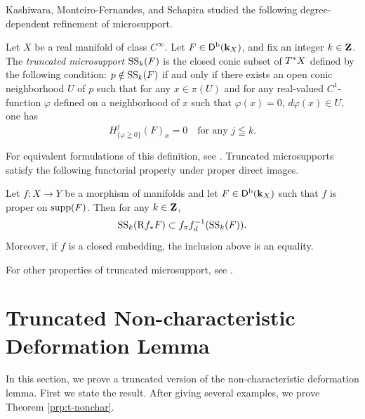 Kashiwara, Monteiro-Fernandes, 
and Schapira 
studied the following degree-dependent refinement 
of microsupport.

\begin{Definition+}\label{dfn:t-ss}
  Let \(X\) be a real manifold of class \(C^{\infty}\).
  Let \(F\in\Dompb(\kk_X)\), and fix an 
  integer \(k\in\zz\). 
  The \emph{truncated microsupport} \(\muS[k](F)\) is
  the closed conic subset of \(\cotb[X]\) 
  defined by the following condition: 
  \(p\notin \muS[k](F)\) 
  if and only if 
  there exists an open conic neighborhood \(U\) of \(p\) 
  such that for any \(x\in \pi(U)\) and 
  for any real-valued \(C^{1}\)-function \(\varphi\) 
  defined on a neighborhood of \(x\) such that 
  \(\varphi(x)=0\), \(d\varphi(x)\in U\), 
  one has \begin{equation}
    H^{j}_{\{\varphi\geqq0\}}(F)_x=0
    \quad \text{for any \(j\leqq k\).}
  \end{equation}
\end{Definition+}

For equivalent formulations of this definition,
see \cite{KMS03a}. 
Truncated microsupports satisfy 
the following functorial property under proper direct images.

\begin{Proposition+}\label{prp:t-push}
  Let \(f\colon X\to Y\) be a morphism of 
  manifolds and let \(F\in\Dompb(\kk_X)\) such that \(f\) is proper on \(\supp(F)\). 
  Then for any \(k\in\zz\), 
  \begin{equation}\label{eq:t-push}
    \muS[k](\Rder{f_{\ast}}F)\subset
    \mpb[f]\mdiff[f]^{-1}(\muS[k](F)).
  \end{equation}
  Moreover, if \(f\) is a closed embedding, 
  the inclusion above is an equality.
\end{Proposition+}

For other properties of truncated microsupport, 
see \cite{KMS03a,KMS03b,FM07}. 


\section{Truncated Non-characteristic Deformation Lemma}\label{sec:t-nonchar}

In this section, we prove a truncated version of 
the non-characteristic deformation lemma. 
First we state the result. 
After giving several examples, 
we prove Theorem \ref{prp:t-nonchar}. 


